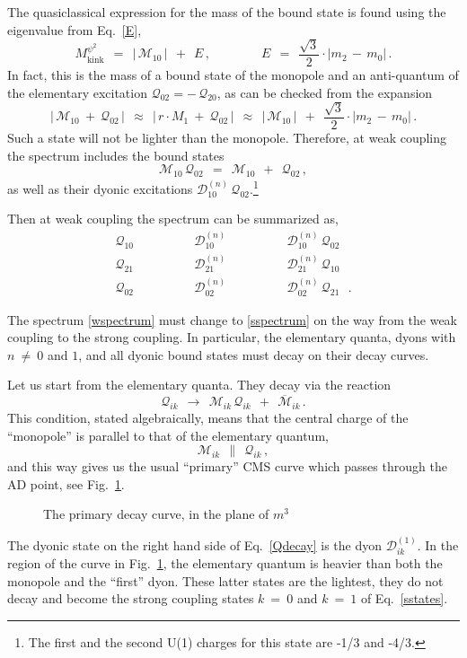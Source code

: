 \documentclass[epsfig,12pt]{article}
\def\beq{\begin{equation}}
\def\eeq{\end{equation}}
\def\beq{\begin{equation}}
\def\eeq{\end{equation}}
\newcommand{\ov}{\overline}
\newcommand{\M}{\mathcal{M}}
\newcommand{\Q}{\mathcal{Q}}
\newcommand{\D}{\mathcal{D}}
\begin{document}
	The quasiclassical expression for the mass of the bound state is found using the eigenvalue from Eq.~\eqref{E},
\beq
\label{kinkpsi}
	M_\text{kink}^{\psi^2}  ~~=~~ \left|\, \M_{10} \,\right|  ~~+~~  E\,,  
	\qquad\qquad
	E  ~~=~~  \frac{\sqrt{3}}{2} \cdot | m_2 \,-\, m_0 |\,.
\eeq
	In fact, this is the mass of a bound state of the monopole and an anti-quantum of the 
	elementary excitation
$ \Q_{02} =  -\, \Q_{20} $,
	as can be checked from the expansion
\beq
	\left|\, \M_{10} ~+~ \Q_{02} \,\right|  ~~\approx~~  \left|\, r \cdot M_1 ~+~ \Q_{02} \,\right|
					        ~~\approx~~  \left|\, \M_{10} \,\right|  ~~+~~  \frac{\sqrt{3}}{2} \cdot | m_2 \,-\, m_0 |\,.
\eeq
	Such a state will not be lighter than the monopole.
	Therefore, at weak coupling the spectrum includes the bound states
\beq
	\M_{10}\,\Q_{02}  ~~=~~  \M_{10}  ~~+~~  \Q_{02}\,,
\eeq
	as well as their dyonic excitations $ \D_{10}^{(n)}\,\Q_{02} $.\footnote{The first and the second  U(1) charges for this state are -1/3 and -4/3.}
	

	Then at weak coupling the spectrum can be summarized as,
\beq
\label{wspectrum}
	\begin{array}{ccc}
		\Q_{10} \qquad\qquad    &    \D_{10}^{(n)} \qquad\qquad    &    \D_{10}^{(n)}\, \Q_{02}   \phantom{~~~.}    \\[2mm]
		\Q_{21} \qquad\qquad    &    \D_{21}^{(n)} \qquad\qquad    &    \D_{21}^{(n)}\, \Q_{10}   \phantom{~~~.}    \\[2mm]
		\Q_{02} \qquad\qquad    &    \D_{02}^{(n)} \qquad\qquad    &    \D_{02}^{(n)}\, \Q_{21}   ~~~.
	\end{array}
\eeq

	The spectrum \eqref{wspectrum} must change to \eqref{sspectrum} on the way from the weak coupling to the strong coupling.
	In particular, the elementary quanta, dyons with $ n ~\neq~ 0 $ and $ 1 $, and all dyonic bound states  
	must decay on their decay curves.

	Let us start from the elementary quanta.
	They decay via the reaction
\beq
\label{Qdecay}
	\Q_{ik}  ~~\longrightarrow~~  \M_{ik}\, \Q_{ik} ~~+~~ \ov{\M}{}_{ik}\,.
\eeq
	This condition, stated algebraically, means that the central charge of the ``monopole'' 
	is parallel to that of the elementary quantum,
\beq
\label{parallel}
	\M_{ik}  ~~\parallel~~  \Q_{ik}\,,
\eeq
	and this way gives us the usual ``primary'' CMS curve which passes through the AD point, see Fig.~\ref{fprim}.
\begin{figure}
\begin{center}
\epsfxsize=7.5cm
\caption{\small The primary decay curve, in the plane of $ m^3 $}
\label{fprim}
\end{center}
\end{figure}
	The dyonic state on the right hand side of Eq.~\eqref{Qdecay} is the dyon $ \D_{ik}^{(1)} $.
	In the region of the curve in Fig.~\ref{fprim}, the elementary quantum is heavier than both the monopole and the 
	``first'' dyon.
	These latter states are the lightest, they do not decay and become the strong coupling
	states $ k ~=~ 0 $ and $ k ~=~ 1 $ of Eq.~\eqref{sstates}.
	
\end{document}
